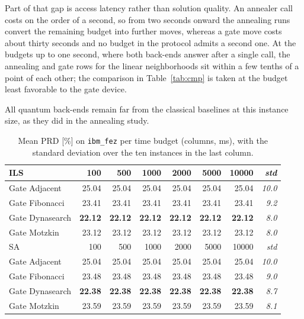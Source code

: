 \documentclass{svproc}
\begin{document}
Part of that gap is access latency rather than solution quality. An annealer
call costs on the order of a second, so from two seconds onward the annealing
runs convert the remaining budget into further moves, whereas a gate move costs
about thirty seconds and no budget in the protocol admits a second one. At the
budgets up to one second, where both back-ends answer after a single call, the
annealing and gate rows for the linear neighborhoods sit within a few tenths of
a point of each other; the comparison in Table~\ref{tab:cmp} is taken at the
budget least favorable to the gate device.

All quantum back-ends remain far from the classical baselines at this instance
size, as they did in the annealing study.

\begin{table}[t]
\centering
\caption{Mean PRD [\%] on \texttt{ibm\_fez} per time budget (columns, ms),
  with the standard deviation over the ten instances in the last column.}
\label{tab:rpd_hw}
\footnotesize
\renewcommand{\arraystretch}{0.95}
\begin{tabular*}{\textwidth}{@{\extracolsep{\fill}}lrrrrrr@{\hspace{1.2em}}r@{}}
\toprule
ILS & 100 & 500 & 1000 & 2000 & 5000 & 10000 & \emph{std} \\
\midrule
Gate Adjacent   & 25.04 & 25.04 & 25.04 & 25.04 & 25.04 & 25.04 & \emph{10.0} \\
Gate Fibonacci  & 23.41 & 23.41 & 23.41 & 23.41 & 23.41 & 23.41 & \emph{9.2} \\
Gate Dynasearch & \textbf{22.12} & \textbf{22.12} & \textbf{22.12} & \textbf{22.12} & \textbf{22.12} & \textbf{22.12} & \emph{8.0} \\
Gate Motzkin    & 23.12 & 23.12 & 23.12 & 23.12 & 23.12 & 23.12 & \emph{8.0} \\
\midrule
SA & 100 & 500 & 1000 & 2000 & 5000 & 10000 & \emph{std} \\
\midrule
Gate Adjacent   & 25.04 & 25.04 & 25.04 & 25.04 & 25.04 & 25.04 & \emph{10.0} \\
Gate Fibonacci  & 23.48 & 23.48 & 23.48 & 23.48 & 23.48 & 23.48 & \emph{9.0} \\
Gate Dynasearch & \textbf{22.38} & \textbf{22.38} & \textbf{22.38} & \textbf{22.38} & \textbf{22.38} & \textbf{22.38} & \emph{8.7} \\
Gate Motzkin    & 23.59 & 23.59 & 23.59 & 23.59 & 23.59 & 23.59 & \emph{8.1} \\
\bottomrule
\end{tabular*}
\end{table}
\end{document}
